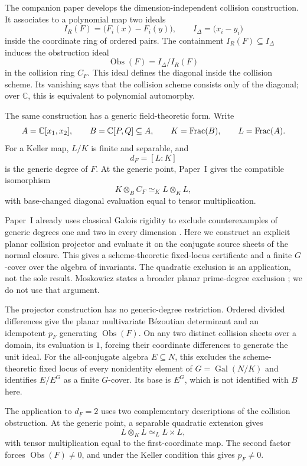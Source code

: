 \documentclass[11pt]{article}
\DeclareMathOperator{\Gal}{Gal}
\newcommand{\C}{\mathbb C}
\newcommand{\Obs}{\operatorname{Obs}}
\begin{document}
The companion paper \cite{VanDerVlugt2026CubicCollision} develops the
dimension-independent collision construction.  It associates to a
polynomial map two ideals
\[
  I_R(F)=\bigl(F_i(x)-F_i(y)\bigr),
  \qquad
  I_\Delta=\bigl(x_i-y_i\bigr)
\]
inside the coordinate ring of ordered pairs.  The containment
\(I_R(F)\subseteq I_\Delta\) induces the obstruction ideal
\[
  \Obs(F)=I_\Delta/I_R(F)
\]
in the collision ring \(C_F\).  This ideal defines the diagonal inside the
collision scheme.  Its vanishing says that the collision scheme consists
only of the diagonal; over \(\C\), this is equivalent to polynomial
automorphy.

The same construction has a generic field-theoretic form.  Write
\[
  A=\C[x_1,x_2],\qquad
  B=\C[P,Q]\subseteq A,\qquad
  K=\Frac(B),\qquad
  L=\Frac(A).
\]
For a Keller map, \(L/K\) is finite and separable, and
\[
  d_F=[L:K]
\]
is the generic degree of \(F\).  At the generic point, Paper~I gives the
compatible isomorphism
\[
  K\otimes_BC_F\simeq_KL\otimes_KL,
\]
with base-changed diagonal evaluation equal to tensor multiplication.

Paper~I already uses classical Galois rigidity to exclude counterexamples
of generic degrees one and two in every dimension
\cite[Corollary~4.1]{VanDerVlugt2026CubicCollision}.  Here we construct an
explicit planar collision projector and evaluate it on the conjugate
source sheets of the normal closure.  This gives a scheme-theoretic
fixed-locus certificate and a finite \(G\)-cover over the algebra of
invariants.  The quadratic exclusion is an application, not the sole
result.  Moskowicz states a broader planar prime-degree exclusion
\cite{Moskowicz2024PrimeDegree}; we do not use that argument.

The projector construction has no generic-degree restriction.  Ordered
divided differences give the planar multivariate B\'ezoutian determinant
and an idempotent \(p_F\) generating \(\Obs(F)\).  On any two distinct
collision sheets over a domain, its evaluation is \(1\), forcing their
coordinate differences to generate the unit ideal.  For the
all-conjugate algebra \(E\subseteq N\), this excludes the
scheme-theoretic fixed locus of every nonidentity element of
\(G=\Gal(N/K)\) and identifies \(E/E^G\) as a finite \(G\)-cover.  Its
base is \(E^G\), which is not identified with \(B\) here.

The application to \(d_F=2\) uses two complementary descriptions of the
collision obstruction.  At the generic point, a separable quadratic
extension gives
\[
  L\otimes_KL\simeq_L L\times L,
\]
with tensor multiplication equal to the first-coordinate map.  The second
factor forces \(\Obs(F)\neq0\), and under the Keller condition this gives
\(p_F\neq0\).
\end{document}
